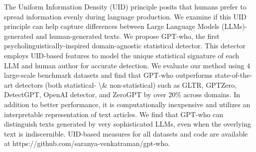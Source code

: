 The Uniform Information Density (UID) principle posits that humans prefer to spread information evenly during language production. We examine if this UID principle can help capture differences between Large Language Models (LLMs)-generated and human-generated texts. We propose GPT-who, the first psycholinguistically-inspired domain-agnostic statistical detector. This detector employs UID-based features to model the unique statistical signature of each LLM and human author for accurate detection.  We evaluate our method using 4 large-scale benchmark datasets and find that GPT-who outperforms state-of-the-art detectors (both statistical- \textbackslash{}\& non-statistical) such as GLTR, GPTZero, DetectGPT, OpenAI detector, and ZeroGPT by over $20$\% across domains. In addition to better performance,  it is computationally inexpensive and utilizes an interpretable representation of text articles. We find that GPT-who can distinguish texts generated by very sophisticated LLMs, even when the overlying text is indiscernible. UID-based measures for all datasets and code are available at https://github.com/saranya-venkatraman/gpt-who.